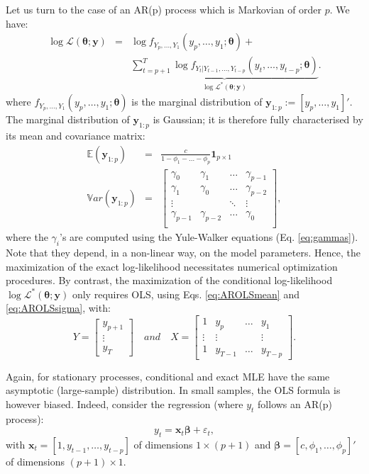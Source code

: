 \documentclass[
  11pt,
]{book}
\theoremstyle{definition}
\theoremstyle{definition}
\theoremstyle{definition}
\theoremstyle{definition}
\theoremstyle{remark}
\begin{document}
Let us turn to the case of an AR(p) process which is Markovian of order \(p\). We have:
\begin{eqnarray*}
\log \mathcal{L}(\boldsymbol\theta;\mathbf{y}) &=& \log f_{Y_p,\dots,Y_1}(y_p,\dots,y_1;\boldsymbol\theta) +\\
&& \underbrace{\sum_{t=p+1}^{T} \log f_{Y_t|Y_{t-1},\dots,Y_{t-p}}(y_t,\dots,y_{t-p};\boldsymbol\theta)}_{\log \mathcal{L}^*(\boldsymbol\theta;\mathbf{y})}.
\end{eqnarray*}
where \(f_{Y_p,\dots,Y_{1}}(y_p,\dots,y_{1};\boldsymbol\theta)\) is the marginal distribution of \(\mathbf{y}_{1:p} := [y_p,\dots,y_1]'\). The marginal distribution of \(\mathbf{y}_{1:p}\) is Gaussian; it is therefore fully characterised by its mean and covariance matrix:
\begin{eqnarray*}
\mathbb{E}(\mathbf{y}_{1:p})&=&\frac{c}{1-\phi_1-\dots-\phi_p} \mathbf{1}_{p\times 1} \\
\mathbb{V}ar(\mathbf{y}_{1:p}) &=& \left[\begin{array}{cccc}
\gamma_0 & \gamma_1 & \dots & \gamma_{p-1} \\
\gamma_1 & \gamma_0 & \dots & \gamma_{p-2} \\
\vdots &  & \ddots & \vdots \\
\gamma_{p-1} & \gamma_{p-2} & \dots & \gamma_{0} \\
\end{array}\right],
\end{eqnarray*}
where the \(\gamma_i\)'s are computed using the Yule-Walker equations (Eq. \eqref{eq:gammas}). Note that they depend, in a non-linear way, on the model parameters. Hence, the maximization of the exact log-likelihood necessitates numerical optimization procedures. By contrast, the maximization of the conditional log-likelihood \(\log \mathcal{L}^*(\boldsymbol\theta;\mathbf{y})\) only requires OLS, using Eqs. \eqref{eq:AROLSmean} and \eqref{eq:AROLSsigma}, with:
\[
Y = \left[\begin{array}{c}
y_{p+1}\\
\vdots\\
y_T
\end{array}\right] \quad and \quad
X = \left[\begin{array}{cccc}
1 & y_p & \dots & y_1\\
\vdots&\vdots&&\vdots\\
1&y_{T-1}&\dots&y_{T-p}
\end{array}\right].
\]

Again, for stationary processes, conditional and exact MLE have the same asymptotic (large-sample) distribution. In small samples, the OLS formula is however biased. Indeed, consider the regression (where \(y_t\) follows an AR(p) process):
\begin{equation}
y_t = \mathbf{x}_t \boldsymbol\beta+ \varepsilon_t,\label{eq:OLSregARp}
\end{equation}
with \(\mathbf{x}_t = [1,y_{t-1},\dots,y_{t-p}]\) of dimensions \(1\times (p+1)\) and \(\boldsymbol\beta = [c,\phi_1,\dots,\phi_p]'\) of dimensions \((p+1)\times 1\).
\end{document}
